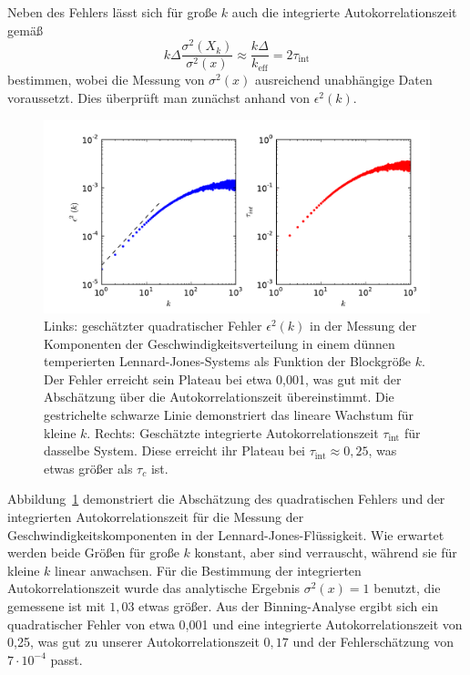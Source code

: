 Neben des Fehlers lässt sich für große $k$ auch die integrierte
Autokorrelationszeit gemäß
\begin{equation}
  \label{eq:tauint}
  k \Delta\frac{\sigma^2(X_k)}{\sigma^2(x)} \approx
  \frac{k\Delta}{k_\text{eff}} = 2\tau_\text{int}
\end{equation}
bestimmen, wobei die Messung von $\sigma^2(x)$ ausreichend unabhängige
Daten voraussetzt. Dies überprüft man zunächst anhand von
$\epsilon^2(k)$.

\begin{figure}
  \centering
  \includegraphics[width=\textwidth]{plots/binning}
  \caption{Links: geschätzter quadratischer Fehler $\epsilon^2(k)$ in
    der Messung der Komponenten der Geschwindigkeitsverteilung in
    einem dünnen temperierten Lennard-Jones-Systems als Funktion der
    Blockgröße $k$. Der Fehler erreicht sein Plateau bei etwa
    0,001, was gut mit der Abschätzung über die Autokorrelationszeit
    übereinstimmt.  Die gestrichelte schwarze Linie demonstriert das
    lineare Wachstum für kleine $k$. Rechts: Geschätzte integrierte
    Autokorrelationszeit $\tau_\text{int}$ für dasselbe System.  Diese
    erreicht ihr Plateau bei $\tau_\text{int} \approx 0,25$, was etwas
    größer als $\tau_c$ ist.}
  \label{fig:binning}
\end{figure}

Abbildung~\ref{fig:binning} demonstriert die Abschätzung des
quadratischen Fehlers und der integrierten Autokorrelationszeit für
die Messung der Geschwindigkeitskomponenten in der
Lennard-Jones-Flüssigkeit. Wie erwartet werden beide Größen für große
$k$ konstant, aber sind verrauscht, während sie für kleine $k$ linear
anwachsen.  Für die Bestimmung der integrierten Autokorrelationszeit
wurde das analytische Ergebnis $\sigma^2(x)=1$ benutzt, die gemessene
ist mit $1,03$ etwas größer. Aus der Binning-Analyse ergibt sich ein
quadratischer Fehler von etwa 0,001 und eine integrierte
Autokorrelationszeit von 0,25, was gut zu unserer Autokorrelationszeit
$0,17$ und der Fehlerschätzung von $7\cdot 10^{-4}$ passt.

